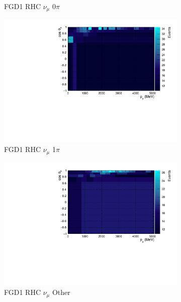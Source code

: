 \begin{figure}
\begin{subfigure}{.32\textwidth}
  \caption{FGD1 RHC $\nu_{\mu}$ 0$\pi$}
  \label{fig:th2polynomFGD1_NuMuBkg_CC0pi_in_AntiNu_Mode}
\end{subfigure}
\begin{subfigure}{.32\textwidth}
  \centering
  \includegraphics[width=0.95\linewidth]{figs/TH2PolyNom_MC_FGD1_NuMuBkg_CC1pi_in_AntiNu_Mode}
  \caption{FGD1 RHC $\nu_{\mu}$ 1$\pi$}
  \label{fig:th2polynomFGD1_NuMuBkg_CC1pi_in_AntiNu_Mode}
\end{subfigure}
\begin{subfigure}{.32\textwidth}
  \centering
  \includegraphics[width=0.95\linewidth]{figs/TH2PolyNom_MC_FGD1_NuMuBkg_CCOther_in_AntiNu_Mode}
  \caption{FGD1 RHC $\nu_{\mu}$ Other}
  \label{fig:th2polynomFGD1_NuMuBkg_CCOther_in_AntiNu_Mode}
\end{subfigure}
\begin{subfigure}{.32\textwidth}
  \centering

\end{subfigure}
\end{figure}
